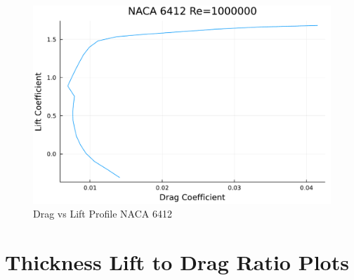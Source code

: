 \documentclass{article}
\begin{document}
\begin{figure}[h]
\begin{minipage}[b]{0.32\textwidth}
\includegraphics[width=\textwidth]{NACA 6412 Re=1000000_Drag_vs_Lift_Coefficent_Plot.pdf}
\caption{\label{fig:NACA 6412 Lift Drag}Drag vs Lift Profile NACA 6412}
\end{minipage}
\end{figure}

\section{Thickness Lift to Drag Ratio Plots}
\label{sec:second_appendix}
\end{document}

